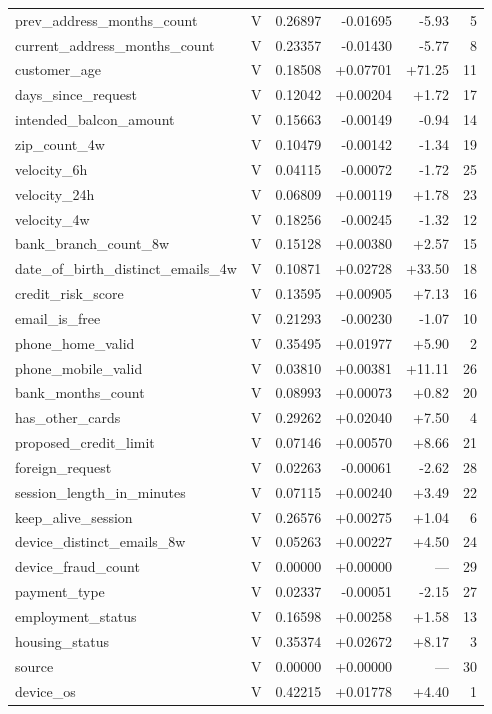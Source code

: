 \begin{longtable}{@{}llrrrr@{}}
prev\_address\_months\_count & V & 0.26897 & -0.01695 & -5.93 & 5 \\
current\_address\_months\_count & V & 0.23357 & -0.01430 & -5.77 & 8 \\
customer\_age & V & 0.18508 & +0.07701 & +71.25 & 11 \\
days\_since\_request & V & 0.12042 & +0.00204 & +1.72 & 17 \\
intended\_balcon\_amount & V & 0.15663 & -0.00149 & -0.94 & 14 \\
zip\_count\_4w & V & 0.10479 & -0.00142 & -1.34 & 19 \\
velocity\_6h & V & 0.04115 & -0.00072 & -1.72 & 25 \\
velocity\_24h & V & 0.06809 & +0.00119 & +1.78 & 23 \\
velocity\_4w & V & 0.18256 & -0.00245 & -1.32 & 12 \\
bank\_branch\_count\_8w & V & 0.15128 & +0.00380 & +2.57 & 15 \\
date\_of\_birth\_distinct\_emails\_4w & V & 0.10871 & +0.02728 & +33.50 & 18 \\
credit\_risk\_score & V & 0.13595 & +0.00905 & +7.13 & 16 \\
email\_is\_free & V & 0.21293 & -0.00230 & -1.07 & 10 \\
phone\_home\_valid & V & 0.35495 & +0.01977 & +5.90 & 2 \\
phone\_mobile\_valid & V & 0.03810 & +0.00381 & +11.11 & 26 \\
bank\_months\_count & V & 0.08993 & +0.00073 & +0.82 & 20 \\
has\_other\_cards & V & 0.29262 & +0.02040 & +7.50 & 4 \\
proposed\_credit\_limit & V & 0.07146 & +0.00570 & +8.66 & 21 \\
foreign\_request & V & 0.02263 & -0.00061 & -2.62 & 28 \\
session\_length\_in\_minutes & V & 0.07115 & +0.00240 & +3.49 & 22 \\
keep\_alive\_session & V & 0.26576 & +0.00275 & +1.04 & 6 \\
device\_distinct\_emails\_8w & V & 0.05263 & +0.00227 & +4.50 & 24 \\
device\_fraud\_count & V & 0.00000 & +0.00000 & --- & 29 \\
payment\_type & V & 0.02337 & -0.00051 & -2.15 & 27 \\
employment\_status & V & 0.16598 & +0.00258 & +1.58 & 13 \\
housing\_status & V & 0.35374 & +0.02672 & +8.17 & 3 \\
source & V & 0.00000 & +0.00000 & --- & 30 \\
device\_os & V & 0.42215 & +0.01778 & +4.40 & 1 \\
\bottomrule
\end{longtable}
